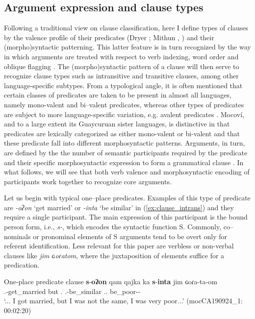 \documentclass[12pt]{article}
\begin{document}
\subsection{Argument expression and clause types} \label{sec:argument expression}
Following a traditional view on clause classification, here I define types of clauses by the valence profile of their predicates  (Dryer \citeyear{Dryer2007}; Mithun \citeyear{Mithun2005}, \citeyear{Mithun2005a}) and their (morpho)syntactic patterning. This latter feature is in turn recognized by the way in which arguments are treated with respect to verb indexing, word order and oblique flagging \citep[see][3--4]{comrie.etal2015}. The (morpho)syntactic pattern of a clause will then serve to recognize clause types such as intransitive and transitive clauses, among other language-specific subtypes. From a typological angle, it is often mentioned that certain classes of predicates are taken to be present in almost all languages, namely mono-valent and bi--valent predicates, whereas  other types of predicates are subject to more language-specific variation, e.g. avalent predicates \citep*[][]{Malchukov2010}. Mocoví, and to a large extent its Guaycuruan sister languages, is distinctive in that predicates are lexically categorized as either mono-valent or bi-valent and that these predicate fall into different morphosyntactic patterns. Arguments, in turn, are defined by the the number of semantic participants required by the predicate and their specific morphosyntactic expression to form a grammatical clause \citep{Song2015}. In what follows, we will see that both verb valence and morphosyntactic encoding of participants work together to recognize core arguments.  

 Let us begin with typical one--place predicates. Examples of this type of predicate are \textit{-oʔon} `get married' or \textit{-inta} `be similar' in (\ref{ex:clause_intrans}) and they require a single participant. The main expression of this participant is the bound person form, i.e., \textit{s-}, which encodes the  syntactic function S. Commonly,  co--nominals or pronominal elements of S arguments tend to be overt only for referent identification. Less relevant for this paper are verbless or non-verbal clauses like \textit{jim ɢoɾatom}, where the juxtaposition of elements suffice for a predication.  

\begin{exe}
 
 \ex One-place predicate clause   
  \gll \textbf{s}-\textbf{oʔon} qam qajka ka \textbf{s}-\textbf{inta} jim ɢoɾa-ta-om \\
 {\First.\I}-get\_married but {\Exist.\Neg} {\DetOne} {\First.\II}-be\_similar {\First.\Sg.\Pron} be\_poor-{\Dur}-{\Ints} \\
 \trans ‘... I got married, but I was not the same, I was very poor...' 
 \trans \hfill (mocCA190924\_1: 00:02:20) \label{ex:clause_intrans}
\end{exe}
 
\end{document}
